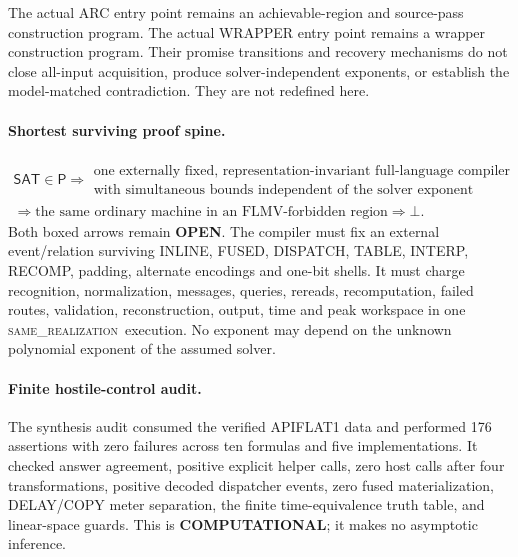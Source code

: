 \documentclass[11pt]{article}
\newcommand{\statusopen}{\textcolor{openstatus}{\textbf{OPEN}}}
\newcommand{\same}{\textnormal{\textsc{same\_realization}}}
\newcommand{\SAT}{\mathsf{SAT}}
\begin{document}
The actual ARC entry point  remains an achievable-region and
source-pass construction program.  The actual WRAPPER entry point
 remains a wrapper construction program.  Their promise
transitions and recovery mechanisms do not close all-input acquisition,
produce solver-independent exponents, or establish the model-matched
contradiction.  They are not redefined here.

\paragraph{Shortest surviving proof spine.}
\[
\begin{gathered}
\SAT\in\mathsf P
\Longrightarrow
\boxed{\begin{array}{c}
\text{one externally fixed, representation-invariant full-language compiler}\\
\text{with simultaneous bounds independent of the solver exponent}
\end{array}}\\
\Longrightarrow
\boxed{\text{the same ordinary machine in an FLMV-forbidden region}}
\Longrightarrow\bot .
\end{gathered}
\]
Both boxed arrows remain \statusopen.  The compiler must fix an external
event/relation surviving INLINE, FUSED, DISPATCH, TABLE, INTERP, RECOMP,
padding, alternate encodings and one-bit shells.  It must charge recognition,
normalization, messages, queries, rereads, recomputation, failed routes,
validation, reconstruction, output, time and peak workspace in one
\same\ execution.  No exponent may depend on the unknown polynomial exponent
of the assumed solver.

\paragraph{Finite hostile-control audit.}
The synthesis audit consumed the verified APIFLAT1 data and performed 176
assertions with zero failures across ten formulas and five implementations.
It checked answer agreement, positive explicit helper calls, zero host calls
after four transformations, positive decoded dispatcher events, zero fused
materialization, DELAY/COPY meter separation, the finite time-equivalence
truth table, and linear-space guards.  This is \textbf{COMPUTATIONAL}; it
makes no asymptotic inference.
\end{document}

